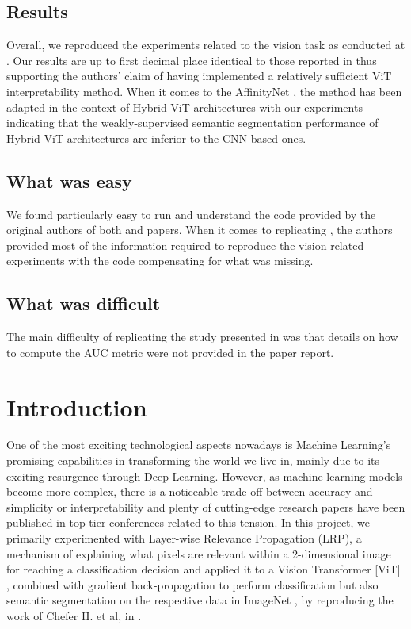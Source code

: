 \subsection{Results}
Overall, we reproduced the experiments related to the vision task as conducted at \cite{mainpaper}. Our results are up to first decimal place identical to those reported in \cite{mainpaper} thus supporting the authors' claim of having implemented a relatively sufficient ViT interpretability method. When it comes to the AffinityNet \cite{ahn2018learning}, the method has been adapted in the context of Hybrid-ViT architectures with our experiments indicating that the weakly-supervised semantic segmentation performance of Hybrid-ViT architectures are inferior to the CNN-based ones.


\subsection{What was easy}
We found particularly easy to run and understand the code provided by the original authors of both \cite{mainpaper} and \cite{ahn2018learning} papers. When it comes to replicating \cite{mainpaper}, the authors provided most of the information required to reproduce the vision-related experiments with the code compensating for what was missing.


\subsection{What was difficult}
The main difficulty of replicating the study presented in \cite{mainpaper} was that details on how to compute the AUC metric were not provided in the paper report. 

\clearpage

\section{Introduction}
\label{section:intro}
One of the most exciting technological aspects nowadays is Machine Learning's promising capabilities in transforming the world we live in, mainly due to its exciting resurgence through Deep Learning. However, as machine learning models become more complex, there is a noticeable trade-off between accuracy and simplicity or interpretability \cite{explanations} and plenty of cutting-edge research papers have been published in top-tier conferences related to this tension. In this project, we primarily experimented with Layer-wise Relevance Propagation (LRP), a mechanism of explaining what pixels are relevant within a 2-dimensional image for reaching a classification decision \cite{renormalizationLRP} and applied it to a Vision Transformer [ViT] \cite{visiontransformer}, combined with gradient back-propagation to perform classification but also semantic segmentation on the respective data in ImageNet \cite{russakovsky2015ImageNet, imagenet-seg}, by reproducing the work of Chefer H. et al, in \cite{mainpaper}.

